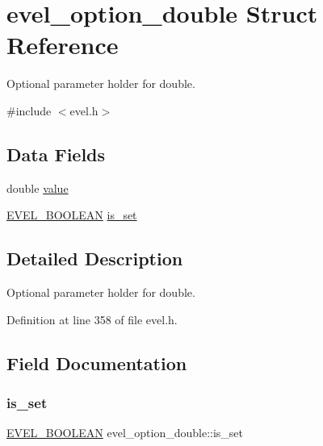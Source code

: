 \hypertarget{structevel__option__double}{}\section{evel\+\_\+option\+\_\+double Struct Reference}
\label{structevel__option__double}


Optional parameter holder for double.  




{\ttfamily \#include $<$evel.\+h$>$}

\subsection*{Data Fields}
\begin{DoxyCompactItemize}
\item 
double \hyperlink{structevel__option__double_a738945aa8b2dba3328031d4fe6d9e298}{value}
\item 
\hyperlink{evel_8h_af6468c18baf048a7617b485eb432197e}{E\+V\+E\+L\+\_\+\+B\+O\+O\+L\+E\+AN} \hyperlink{structevel__option__double_a27b39c8bf86478b351f0a30b5ec4df2a}{is\+\_\+set}
\end{DoxyCompactItemize}


\subsection{Detailed Description}
Optional parameter holder for double. 

Definition at line 358 of file evel.\+h.



\subsection{Field Documentation}
\hypertarget{structevel__option__double_a27b39c8bf86478b351f0a30b5ec4df2a}{}\label{structevel__option__double_a27b39c8bf86478b351f0a30b5ec4df2a} 
\subsubsection{\texorpdfstring{is\+\_\+set}{is\_set}}
{\footnotesize\ttfamily \hyperlink{evel_8h_af6468c18baf048a7617b485eb432197e}{E\+V\+E\+L\+\_\+\+B\+O\+O\+L\+E\+AN} evel\+\_\+option\+\_\+double\+::is\+\_\+set}



